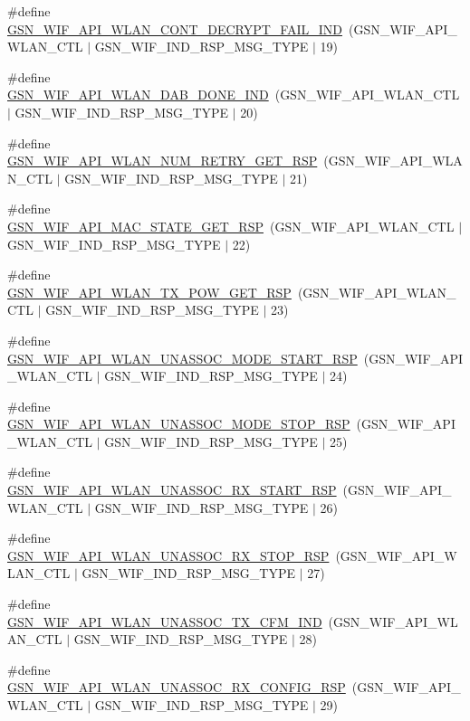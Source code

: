 \begin{DoxyCompactItemize}
\item 
\#define \hyperlink{a00606_a050382039d7970aecd125e5650867a63}{GSN\_\-WIF\_\-API\_\-WLAN\_\-CONT\_\-DECRYPT\_\-FAIL\_\-IND}~(GSN\_\-WIF\_\-API\_\-WLAN\_\-CTL $|$ GSN\_\-WIF\_\-IND\_\-RSP\_\-MSG\_\-TYPE $|$ 19)
\item 
\#define \hyperlink{a00606_ac42ca4847b033a0dd716ba0ea426ac2c}{GSN\_\-WIF\_\-API\_\-WLAN\_\-DAB\_\-DONE\_\-IND}~(GSN\_\-WIF\_\-API\_\-WLAN\_\-CTL $|$ GSN\_\-WIF\_\-IND\_\-RSP\_\-MSG\_\-TYPE $|$ 20)
\item 
\#define \hyperlink{a00606_aa74bbfcfbed9f979db8cb8107c890572}{GSN\_\-WIF\_\-API\_\-WLAN\_\-NUM\_\-RETRY\_\-GET\_\-RSP}~(GSN\_\-WIF\_\-API\_\-WLAN\_\-CTL $|$ GSN\_\-WIF\_\-IND\_\-RSP\_\-MSG\_\-TYPE $|$ 21)
\item 
\#define \hyperlink{a00606_a1b36f022c11587b107a5c881b7f4a1bc}{GSN\_\-WIF\_\-API\_\-MAC\_\-STATE\_\-GET\_\-RSP}~(GSN\_\-WIF\_\-API\_\-WLAN\_\-CTL $|$ GSN\_\-WIF\_\-IND\_\-RSP\_\-MSG\_\-TYPE $|$ 22)
\item 
\#define \hyperlink{a00606_ade1455cde90120f07f6ce732f8f4edef}{GSN\_\-WIF\_\-API\_\-WLAN\_\-TX\_\-POW\_\-GET\_\-RSP}~(GSN\_\-WIF\_\-API\_\-WLAN\_\-CTL $|$ GSN\_\-WIF\_\-IND\_\-RSP\_\-MSG\_\-TYPE $|$ 23)
\item 
\#define \hyperlink{a00606_ad2fe3d876eeb0f842b25d997a0ea34ea}{GSN\_\-WIF\_\-API\_\-WLAN\_\-UNASSOC\_\-MODE\_\-START\_\-RSP}~(GSN\_\-WIF\_\-API\_\-WLAN\_\-CTL $|$ GSN\_\-WIF\_\-IND\_\-RSP\_\-MSG\_\-TYPE $|$ 24)
\item 
\#define \hyperlink{a00606_aaae2b9eaaef814ac098dbe0e78b79dcb}{GSN\_\-WIF\_\-API\_\-WLAN\_\-UNASSOC\_\-MODE\_\-STOP\_\-RSP}~(GSN\_\-WIF\_\-API\_\-WLAN\_\-CTL $|$ GSN\_\-WIF\_\-IND\_\-RSP\_\-MSG\_\-TYPE $|$ 25)
\item 
\#define \hyperlink{a00606_ac189a3913a0937bae3c8d51279d222d8}{GSN\_\-WIF\_\-API\_\-WLAN\_\-UNASSOC\_\-RX\_\-START\_\-RSP}~(GSN\_\-WIF\_\-API\_\-WLAN\_\-CTL $|$ GSN\_\-WIF\_\-IND\_\-RSP\_\-MSG\_\-TYPE $|$ 26)
\item 
\#define \hyperlink{a00606_ad2dd03a292cee38878b70dff36b5226e}{GSN\_\-WIF\_\-API\_\-WLAN\_\-UNASSOC\_\-RX\_\-STOP\_\-RSP}~(GSN\_\-WIF\_\-API\_\-WLAN\_\-CTL $|$ GSN\_\-WIF\_\-IND\_\-RSP\_\-MSG\_\-TYPE $|$ 27)
\item 
\#define \hyperlink{a00606_a76c950c06223a6ea6b05ae45124c7846}{GSN\_\-WIF\_\-API\_\-WLAN\_\-UNASSOC\_\-TX\_\-CFM\_\-IND}~(GSN\_\-WIF\_\-API\_\-WLAN\_\-CTL $|$ GSN\_\-WIF\_\-IND\_\-RSP\_\-MSG\_\-TYPE $|$ 28)
\item 
\#define \hyperlink{a00606_a8766e85ca051694ef429be0992bcb5a5}{GSN\_\-WIF\_\-API\_\-WLAN\_\-UNASSOC\_\-RX\_\-CONFIG\_\-RSP}~(GSN\_\-WIF\_\-API\_\-WLAN\_\-CTL $|$ GSN\_\-WIF\_\-IND\_\-RSP\_\-MSG\_\-TYPE $|$ 29)

\end{DoxyCompactItemize}
